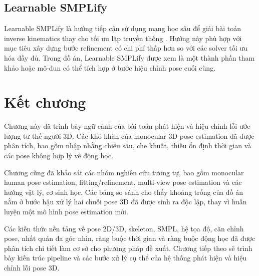 \documentclass[../DoAn.tex]{subfiles}
\begin{document}
\subsection{Learnable SMPLify}
Learnable SMPLify là hướng tiếp cận sử dụng mạng học sâu để giải bài toán inverse kinematics thay cho tối ưu lặp truyền thống \cite{yang2025learnable}. Hướng này phù hợp với mục tiêu xây dựng bước refinement có chi phí thấp hơn so với các solver tối ưu hóa đầy đủ. Trong đồ án, Learnable SMPLify được xem là một thành phần tham khảo hoặc mô-đun có thể tích hợp ở bước hiệu chỉnh pose cuối cùng.

\section*{Kết chương}
Chương này đã trình bày ngữ cảnh của bài toán phát hiện và hiệu chỉnh lỗi ước lượng tư thế người 3D. Các khó khăn của monocular 3D pose estimation đã được phân tích, bao gồm nhập nhằng chiều sâu, che khuất, thiếu ổn định thời gian và các pose không hợp lý về động học.

Chương cũng đã khảo sát các nhóm nghiên cứu tương tự, bao gồm monocular human pose estimation, fitting/refinement, multi-view pose estimation và các hướng vật lý, cơ sinh học. Các bảng so sánh cho thấy khoảng trống của đồ án nằm ở bước hậu xử lý hai chuỗi pose 3D đã được sinh ra độc lập, thay vì huấn luyện một mô hình pose estimation mới.

Các kiến thức nền tảng về pose 2D/3D, skeleton, SMPL, hệ tọa độ, căn chỉnh pose, nhất quán đa góc nhìn, ràng buộc thời gian và ràng buộc động học đã được phân tích chi tiết làm cơ sở cho phương pháp đề xuất. Chương tiếp theo sẽ trình bày kiến trúc pipeline và các bước xử lý cụ thể của hệ thống phát hiện và hiệu chỉnh lỗi pose 3D.
\end{document}
